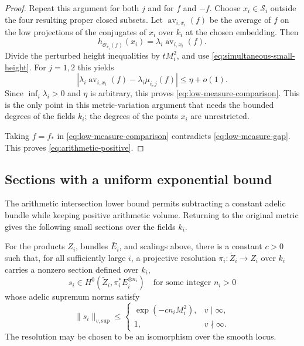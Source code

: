 \begin{proof}
Repeat this argument for both \(j\) and for \(f\) and \(-f\).
Choose \(x_i\in\mathcal S_i\) outside the four resulting proper
closed subsets.  Let \(\operatorname{av}_{i,x_i}(f)\) be the average
of \(f\) on the low projections of the conjugates of \(x_i\) over
\(k_i\) at the chosen embedding.  Then
\[
 h_{\overline{\mathcal O}_{v_i}(f)}(x_i)
 =\lambda_i\operatorname{av}_{i,x_i}(f).
\]
Divide the perturbed height inequalities by \(tM_i^2\), and use
\eqref{eq:simultaneous-small-height}.  For \(j=1,2\) this yields
\[
 \left|\lambda_i\operatorname{av}_{i,x_i}(f)
             -\lambda_i\mu_{i,j}(f)\right|
 \le\eta+o(1).
\]
Since \(\inf_i\lambda_i>0\) and \(\eta\) is arbitrary, this proves
\eqref{eq:low-measure-comparison}.  This is the only point in this
metric-variation argument that needs the bounded degrees of the fields
\(k_i\); the degrees of the points \(x_i\) are unrestricted.

Taking \(f=f_*\) in \eqref{eq:low-measure-comparison} contradicts
\eqref{eq:low-measure-gap}.  This proves
\eqref{eq:arithmetic-positive}.
\end{proof}

\subsection{Sections with a uniform exponential bound}

The arithmetic intersection lower bound permits subtracting a constant
adelic bundle while keeping positive arithmetic volume.  Returning to
the original metric gives the following small sections over the fields
\(k_i\).

\begin{lemma}\label{lemma:small-sections}
For the products \(Z_i\), bundles \(\bar E_i\), and scalings above,
there is a constant \(c>0\) such that, for all sufficiently large
\(i\), a projective resolution \(\pi_i:\widetilde Z_i\to Z_i\)
over \(k_i\) carries a nonzero section defined over \(k_i\),
\[
 s_i\in H^0(\widetilde Z_i,\pi_i^*E_i^{\otimes n_i})
 \quad\text{for some integer }n_i>0
\]
whose adelic supremum norms satisfy
\begin{equation}\label{eq:small-section-norms}
 \|s_i\|_{v,\mathrm{sup}}\le
 \begin{cases}
 \exp(-cn_iM_i^2),&v\mid\infty,\\
 1,&v\nmid\infty.
 \end{cases}
\end{equation}
The resolution may be chosen to be an isomorphism over the smooth locus.
\end{lemma}

